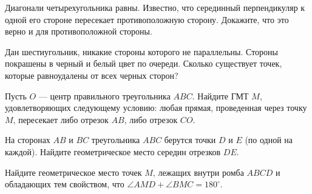 \begin{problems}

\item   Диагонали четырехугольника равны. Известно, что серединный перпендикуляр к одной его стороне пересекает противоположную сторону. Докажите, что это верно и для противоположной стороны.

\item   Дан шестиугольник, никакие стороны которого не параллельны. Стороны покрашены в черный и белый цвет по очереди. Сколько существует точек, которые равноудалены от всех черных сторон?



\item   Пусть $O$ --- центр правильного треугольника $ABC$. Найдите ГМТ $M$, удовлетворяющих следующему условию: любая прямая, проведенная через точку $M$, пересекает либо отрезок $AB$, либо отрезок $CO$.


\item На сторонах $AB$ и $BC$ треугольника $ABC$ берутся точки $D$ и $E$ (по одной на каждой). Найдите геометрическое место середин отрезков $DE$.

\item Найдите геометрическое место точек $M$, лежащих внутри ромба $ABCD$ и обладающих тем свойством, что  $ \angle AMD +  \angle BMC = 180^\circ$.


\end{problems}
